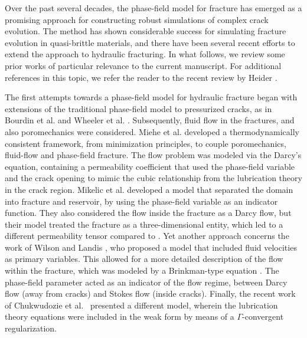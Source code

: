 








    Over the past several decades, the phase-field model for fracture \cite{francfort1998revisiting, bourdin2000numerical, karma2001phase} has emerged as a promising approach for constructing robust simulations of complex crack evolution.  The method has shown considerable success for simulating fracture evolution in quasi-brittle materials, and there have been several recent efforts to extend the approach to hydraulic fracturing. In what follows, we review some prior works of particular relevance to the current manuscript.  For additional references in this topic, we refer the reader to the recent review by Heider \cite{heider2021review}.

    The first attempts towards a phase-field model for hydraulic fracture began with extensions of the traditional phase-field model to pressurized cracks, as in Bourdin et al. \cite{bourdin2012variational} and Wheeler et al. \cite{wheeler2014augmented}. Subsequently, fluid flow in the fractures, and also poromechanics were considered. Miehe et al. \cite{miehe2015minimization, miehe2016phase} developed a thermodynamically consistent framework, from minimization principles, to couple poromechanics, fluid-flow and phase-field fracture. The flow problem was modeled via the Darcy's equation, containing a permeability coefficient that used the phase-field variable and the crack opening to mimic the cubic relationship from the lubrication theory in the crack region. Mikelic et al. \cite{mikelic2015phase1, mikelic2015phase2} developed a model that separated the domain into fracture and reservoir, by using the phase-field variable as an indicator function. They also considered the flow inside the fracture as a Darcy flow, but their model treated the fracture as a three-dimensional entity, which led to a different permeability tensor compared to \cite{miehe2015minimization, miehe2016phase}.  Yet another approach concerns the work of Wilson and Landis \cite{wilson2016phase}, who proposed a model that included fluid velocities as primary variables. This allowed for a more detailed description of the flow within the fracture, which was modeled by a Brinkman-type equation \cite{brinkman1949calculation}. The phase-field parameter acted as an indicator of the flow regime, between Darcy flow (away from cracks) and Stokes flow (inside cracks).  Finally, the recent work of Chukwudozie et al.\ \cite{chukwudozie2019variational} presented a different model, wherein the lubrication theory equations were included in the weak form by means of a $\Gamma$-convergent regularization. 

